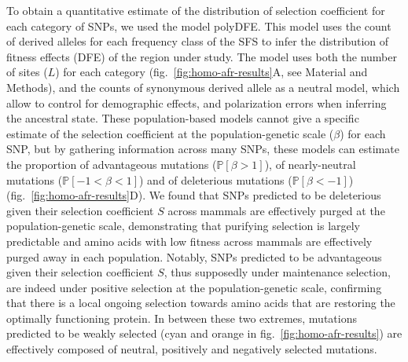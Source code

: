 \documentclass{article}
\newcommand{\proba}{\mathbb{P}}
\newcommand{\Sphy}{S}
\newcommand{\Spop}{\beta}
\newcommand{\polyDel}{\Spop < -1}
\newcommand{\polyNeutral}{-1 < \Spop < 1}
\newcommand{\polyAdv}{ \Spop > 1}
\newcommand{\PpolyDel}{\proba \left[ \polyDel \right]}
\newcommand{\PpolyNeutral}{\proba \left[ \polyNeutral \right]}
\newcommand{\PpolyAdv}{\proba \left[ \polyAdv \right]}
\begin{document}
    To obtain a quantitative estimate of the distribution of selection coefficient for each category of SNPs, we used the model polyDFE\cite{tataru_inference_2017, tataru_polydfe_2020}.
    This model uses the count of derived alleles for each frequency class of the SFS to infer the distribution of fitness effects (DFE) of the region under study.
    The model uses both the number of sites ($L$) for each category (fig.~\ref{fig:homo-afr-results}A, see Material and Methods), and the counts of synonymous derived allele as a neutral model, which allow to control for demographic effects, and polarization errors when inferring the ancestral state.
    These population-based models cannot give a specific estimate of the selection coefficient at the population-genetic scale ($\Spop$) for each SNP, but by gathering information across many SNPs, these models can estimate the proportion of advantageous mutations ($\PpolyAdv$), of nearly-neutral mutations ($\PpolyNeutral$) and of deleterious mutations ($\PpolyDel$) (fig.~\ref{fig:homo-afr-results}D).
    We found that SNPs predicted to be deleterious given their selection coefficient $\Sphy$ across mammals are effectively purged at the population-genetic scale, demonstrating that purifying selection is largely predictable and amino acids with low fitness across mammals are effectively purged away in each population.
    Notably, SNPs predicted to be advantageous given their selection coefficient $\Sphy$, thus supposedly under maintenance selection, are indeed under positive selection at the population-genetic scale, confirming that there is a local ongoing selection towards amino acids that are restoring the optimally functioning protein.
    In between these two extremes, mutations predicted to be weakly selected (cyan and orange in fig.~\ref{fig:homo-afr-results}) are effectively composed of neutral, positively and negatively selected mutations.
\end{document}
